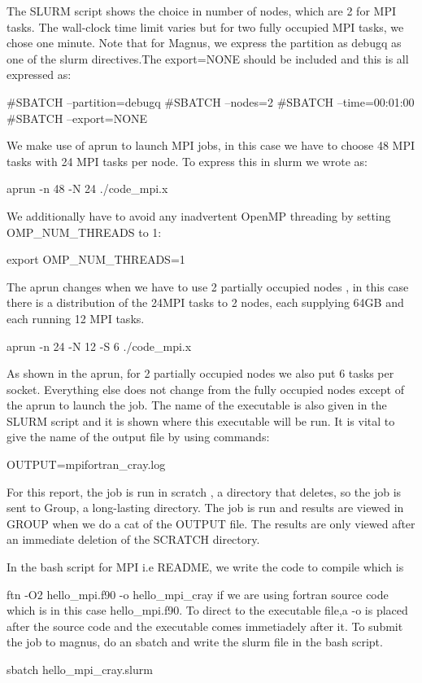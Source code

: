 \begin{Document}
{The SLURM script shows the choice in number of nodes, which are 2 for MPI tasks. 
The wall-clock time limit varies but for two fully occupied MPI tasks, we chose one minute.
Note that for Magnus, we express the partition as debugq as one of the slurm directives.The export=NONE should be included and this is all expressed as:

#SBATCH --partition=debugq
#SBATCH --nodes=2
#SBATCH --time=00:01:00
#SBATCH --export=NONE

We make use of aprun to launch MPI jobs, in this case we have to choose 48 MPI tasks with 24 MPI tasks per node.
To express this in slurm we wrote as:

aprun -n 48 -N 24 ./code_mpi.x

We additionally have to avoid any inadvertent OpenMP threading by setting OMP_NUM_THREADS to 1:

export OMP_NUM_THREADS=1

The aprun changes when we have to use 2 partially occupied nodes , in this case there is a distribution of the 24MPI tasks to 2 nodes, each supplying 64GB and each running 12 MPI tasks.

aprun -n 24 -N 12 -S 6 ./code_mpi.x

As shown in the aprun, for 2 partially occupied nodes we also put 6 tasks per socket.
Everything else does not change from the fully occupied nodes except of the aprun to launch the job.
The name of the executable is also given in the SLURM script and it is shown where this executable will be run.
It is vital to give the name of the output file by using commands:

OUTPUT=mpifortran_cray.log
 
For this report, the job is run in scratch , a directory that deletes, so the job is sent to Group, a long-lasting directory. 
The job is run and results are viewed in GROUP when we do a cat of the OUTPUT file. 
The results are only viewed  after an immediate deletion of the SCRATCH directory.

In the bash script for MPI i.e README, we write the code to compile which is 

ftn -O2 hello_mpi.f90 -o hello_mpi_cray if we are using fortran source code which is in this case hello_mpi.f90. 
To direct to the executable file,a -o is placed after the source code and the executable comes immetiadely after it.
To submit the job to magnus, do an sbatch and write the slurm file in the bash script.

sbatch hello_mpi_cray.slurm

}
\end{Document}
